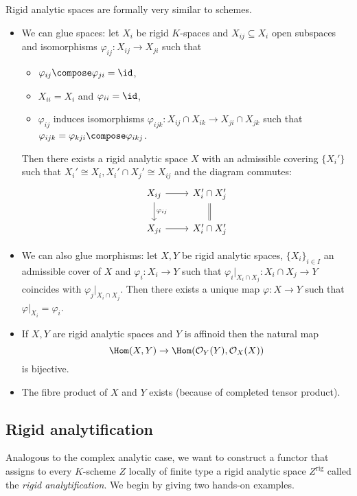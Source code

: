 \documentclass[a4paper]{article}
\renewcommand*{\O}{\mathcal{O}}
\begin{document}
\begin{remark}
  Rigid analytic spaces are formally very similar to schemes.
  \begin{itemize}
  \item We can glue spaces: let \(X_i\) be rigid \(K\)-spaces and \(X_{ij} \subseteq X_i\) open subspaces and isomorphisms \(\varphi_{ij}: X_{ij} \to X_{ji}\) such that
    \begin{itemize}
    \item \(\varphi_{ij} \compose \varphi_{ji} = \id\),
    \item \(X_{ii} = X_i\) and \(\varphi_{ii} = \id\),
    \item \(\varphi_{ij}\) induces isomorphisms \(\varphi_{ijk}: X_{ij} \cap X_{ik} \to X_{ji} \cap X_{jk}\) such that \(\varphi_{ijk} = \varphi_{kji} \compose \varphi_{ikj}\).
    \end{itemize}
    Then there exists a rigid analytic space \(X\) with an admissible covering \(\{X_i'\}\) such that \(X_i' \cong X_i, X_i' \cap X_j' \cong X_{ij}\) and the diagram commutes:
    \[
      \begin{tikzcd}
        X_{ij} \ar[r] \ar[d, "\varphi_{ij}"] & X_i' \cap X_j' \ar[d, equal] \\
        X_{ji} \ar[r] & X_i' \cap X_j'
      \end{tikzcd}
    \]
  \item We can also glue morphisms: let \(X, Y\) be rigid analytic spaces, \(\{X_i\}_{i \in I}\) an admissible cover of \(X\) and \(\varphi_i: X_i \to Y\) such that \(\varphi_i|_{X_i \cap X_j}: X_i \cap X_j \to Y\) coincides with \(\varphi_j|_{X_i \cap X_j}\). Then there exists a unique map \(\varphi: X \to Y\) such that \(\varphi|_{X_i} = \varphi_i\).
  \item If \(X, Y\) are rigid analytic spaces and \(Y\) is affinoid then the natural map
    \[
      \Hom(X, Y) \to \Hom(\O_Y(Y), \O_X(X))
    \]
    is bijective.
  \item The fibre product of \(X\) and \(Y\) exists (because of completed tensor product).
  \end{itemize}
\end{remark}

\subsection{Rigid analytification}

Analogous to the complex analytic case, we want to construct a functor that assigns to every \(K\)-scheme \(Z\) locally of finite type a rigid analytic space \(Z^{\mathrm{rig}}\) called the \emph{rigid analytification}. We begin by giving two hands-on examples.
\end{document}
